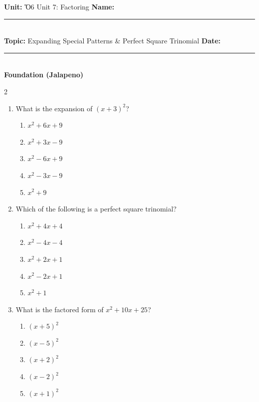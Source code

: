 \documentclass[10pt]{article}
\begin{document}
\enlargethispage{2.5cm}

\begin{tcolorbox}[colback=mainblue!5, colframe=mainblue, sharp corners, boxrule=0.5pt]
    \small \textbf{Unit:} Ὅ6 Unit 7: Factoring \hfill \textbf{Name:} \rule{3cm}{0.4pt} \\
    \small \textbf{Topic:} Expanding Special Patterns & Perfect Square Trinomial \hfill \textbf{Date:} \rule{2cm}{0.4pt} \\
    \centering \textbf{\large Foundation (Jalapeno)}
\end{tcolorbox}

\vspace{0.2cm}

\begin{multicols}{2}
\begin{enumerate}[label=\textbf{Q\arabic*.}, leftmargin=*, itemsep=6pt, parsep=0pt]

  \item \small What is the expansion of $(x + 3)^2$?
  \begin{enumerate}[label=(\Alph*), leftmargin=0.6cm, nosep, itemsep=2pt]
    \item $x^2 + 6x + 9$
    \item $x^2 + 3x - 9$
    \item $x^2 - 6x + 9$
    \item $x^2 - 3x - 9$
    \item $x^2 + 9$
  \end{enumerate}

  \item \small Which of the following is a perfect square trinomial?
  \begin{enumerate}[label=(\Alph*), leftmargin=0.6cm, nosep, itemsep=2pt]
    \item $x^2 + 4x + 4$
    \item $x^2 - 4x - 4$
    \item $x^2 + 2x + 1$
    \item $x^2 - 2x + 1$
    \item $x^2 + 1$
  \end{enumerate}

  \item \small What is the factored form of $x^2 + 10x + 25$?
  \begin{enumerate}[label=(\Alph*), leftmargin=0.6cm, nosep, itemsep=2pt]
    \item $(x + 5)^2$
    \item $(x - 5)^2$
    \item $(x + 2)^2$
    \item $(x - 2)^2$
    \item $(x + 1)^2$
  \end{enumerate}


\end{enumerate}
\end{multicols}
\end{document}
